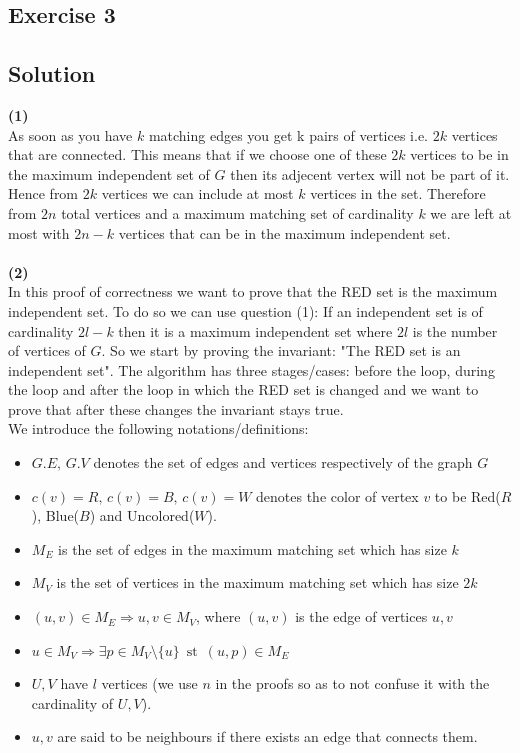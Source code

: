 \documentclass[10pt,a4paper]{article}
\begin{document}
\break
\subsection*{Exercise 3}
\subsection*{Solution}

\textbf{(1)}\\
As soon as you have $k$ matching edges you get k pairs of vertices i.e. $2k$ vertices that are connected. This means that if we choose one of these $2k$ vertices  to be in the maximum independent set of $G$ then its adjecent vertex will not be part of it. Hence from $2k$ vertices we can include at most $k$ vertices in the set. Therefore from $2n$ total vertices and a maximum matching set of cardinality $k$ we are left at most with $2n - k$ vertices that can be in the maximum independent set.\\\\
\textbf{(2)}\\
In this proof of correctness we want to prove that the RED set is the maximum independent set. To do so we can use question (1): If an independent set is of cardinality $2l-k$ then it is a maximum independent set where $2l$ is the number of vertices of $G$. So we start by proving the invariant: "The RED set is an independent set". The algorithm has three stages/cases: before the loop, during the loop and after the loop in which the RED set is changed and we want to prove that after these changes the invariant stays true.\\ 
We introduce the following notations/definitions:
\begin{itemize}
\item $G.E, \, G.V$ denotes the set of edges and vertices respectively of the graph $G$
\item $c(v) = R, \, c(v) = B, \, c(v) = W$ denotes the color of vertex $v$ to be Red($R$), Blue($B$) and Uncolored($W$).
\item $M_E$ is the set of edges in the maximum matching set which has size $k$
\item $M_V$ is the set of vertices in the maximum matching set which has size $2k$
\item $(u,v) \in M_E \Rightarrow u,v \in M_V$, where $(u,v)$ is the edge of vertices $u,v$
\item $u \in M_V \Rightarrow \exists p \in M_V\setminus \{u\} \,\text{ st } \,(u,p) \in M_E$
\item $U, V$ have $l$ vertices (we use $n$ in the proofs so as to not confuse it with the cardinality of $U,V$).
\item $u,v$ are said to be neighbours if there exists an edge that connects them.
\end{itemize}
\end{document}
